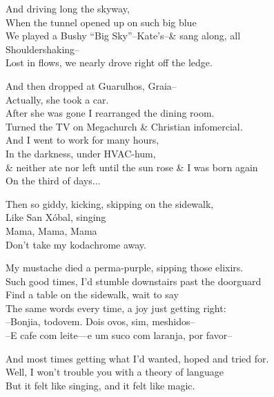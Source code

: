 


And driving long the skyway, \\
When the tunnel opened up on such big blue \\
We played a Bushy ``Big Sky''--Kate's--\& sang along, all \\ %
Shouldershaking-- \\
Lost in flows, we nearly drove right off the ledge. 

And then dropped at Guarulhos, Graia-- \\
Actually, she took a car. \\
After she was gone I rearranged the dining room. \\
Turned the TV on Megachurch \& Christian infomercial. \\
And I went to work for many hours, \\
In the darkness, under HVAC-hum, \\
\& neither ate nor left until the sun rose \& I was born again\\
On the third of days...

Then so giddy, kicking, skipping on the sidewalk, \\
Like San Xóbal, singing \\
\qquad Mama, Mama, Mama \\
\qquad Don't take my kodachrome away.

My mustache died a perma-purple, sipping those elixirs. \\
Such good times, I'd stumble downstairs past the doorguard \\
Find a table on the sidewalk, wait to say \\
The same words every time, a joy just getting right: \\
--Bonjia, todovem. Dois ovos, sim, meshidos-- \\
--E cafe com leite—e um suco com laranja, por favor--

And most times getting what I'd wanted, hoped and tried for. \\
Well, I won't trouble you with a theory of language \\
But it felt like singing, and it felt like magic. 

